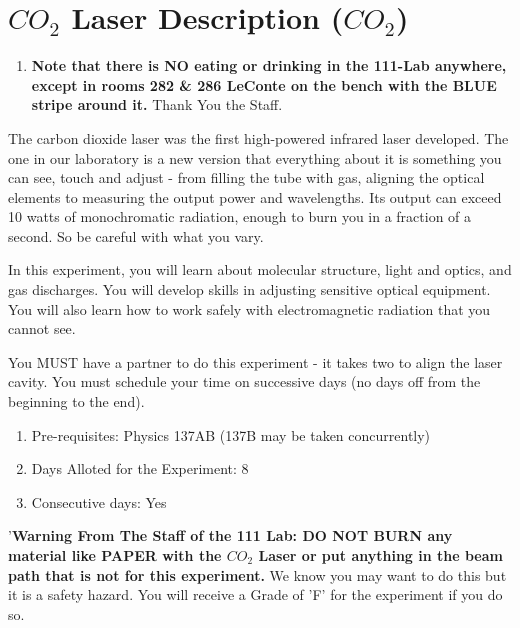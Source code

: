 \documentclass{../lab}
\begin{document}
\maketitle

\tableofcontents
\section{$CO_2 $ Laser Description ($CO_2 $)}

\begin{enumerate}
    \item \textbf{Note that there is NO eating or drinking in the 111-Lab anywhere, except in rooms 282 \& 286 LeConte on the bench with the BLUE stripe around it.} Thank You the Staff.
\end{enumerate}

The carbon dioxide laser was the first high-powered infrared laser developed. The one in our laboratory is a new version that everything about it is something you can see, touch and adjust - from filling the tube with gas, aligning the optical elements to measuring the output power and wavelengths. Its output can exceed 10 watts of monochromatic radiation, enough to burn you in a fraction of a second. So be careful with what you vary.

In this experiment, you will learn about molecular structure, light and optics, and gas discharges. You will develop skills in adjusting sensitive optical equipment. You will also learn how to work safely with electromagnetic radiation that you cannot see.

You MUST have a partner to do this experiment - it takes two to align the laser cavity. You must schedule your time on successive days (no days off from the beginning to the end).

\begin{enumerate}
    \item Pre-requisites: Physics 137AB (137B may be taken concurrently)
    \item Days Alloted for the Experiment: 8
    \item Consecutive days: Yes
\end{enumerate}

'\textbf{Warning From The Staff of the 111 Lab: DO NOT BURN any material like PAPER with the $CO_2 $ Laser or put anything in the beam path that is not for this experiment.} We know you may want to do this but it is a safety hazard. You will receive a Grade of 'F' for the experiment if you do so.
\end{document}
